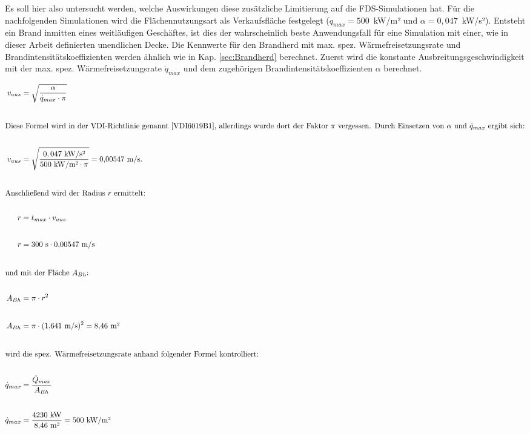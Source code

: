 Es soll hier also untersucht werden, welche Auswirkungen diese zusätzliche Limitierung auf die FDS-Simulationen hat. Für die nachfolgenden Simulationen wird die Flächennutzungsart als Verkaufsfläche festgelegt ($\Dot{q}_{max}=500$~kW/m² und $\alpha=0{,}047$~kW/s²). Entsteht ein Brand inmitten eines weitläufigen Geschäftes, ist dies der wahrscheinlich beste Anwendungsfall für eine Simulation mit einer, wie in dieser Arbeit definierten unendlichen Decke. 
Die Kennwerte für den Brandherd mit max. spez. Wärmefreisetzungsrate und Brand\-in\-ten\-si\-täts\-ko\-ef\-fi\-zien\-ten werden ähnlich wie in Kap. \ref{sec:Brandherd} berechnet. Zuerst wird die konstante Ausbreitungsgeschwindigkeit mit der max. spez. Wärmefreisetzungsrate $\Dot{q}_{max}$ und dem zugehörigen Brandintensitätskoeffizienten $\alpha$ berechnet. 

\begin{align}
    v_{aus} &= \sqrt{\frac{\alpha}{\Dot{q}_{max}\cdot \pi}} \\[20pt]
    \intertext{Diese Formel wird in der VDI-Richtlinie genannt \cite[S.13]{VDI6019B1}, allerdings wurde dort der Faktor $\pi$ vergessen. Durch Einsetzen von $\alpha$ und $\Dot{q}_{max}$ ergibt sich:} \nonumber\\
    v_{aus} &= \sqrt{\frac{0,047~\text{kW/s²}}{500~\text{kW/m²}\cdot \pi}}=0{,}00547~\text{m/s}. \\[20pt]
    \intertext{Anschließend wird der Radius $r$ ermittelt:} \nonumber\\
    r&= t_{max} \cdot v_{aus} \\[20pt]
    r&= 300~\ta{s} \cdot 0{,}00547~\text{m/s} \\[20pt]
    \intertext{und mit der Fläche $A_{Bh}$:} \nonumber\\
    A_{Bh}&=\pi \cdot r^2\\[20pt]
    A_{Bh}&=\pi \cdot (1{,}641~\text{m/s})^2 = 8{,}46~\ta{m²} \\[20pt]
    \intertext{wird die spez. Wärmefreisetzungsrate anhand folgender Formel kontrolliert:} \nonumber\\
    \Dot{q}_{max}&=\frac{\Dot{Q}_{max}}{A_{Bh}}\\[20pt]
    \Dot{q}_{max}&=\frac{4230~\ta{kW}}{8{,}46~\ta{m²}}=500~\ta{kW/m²}
\end{align}

